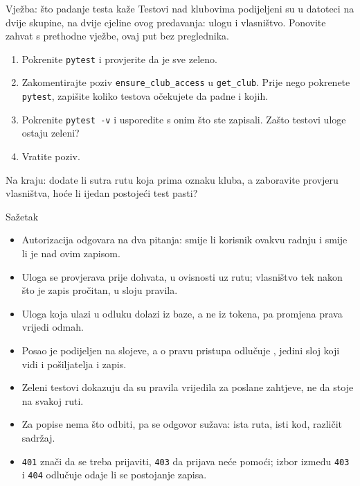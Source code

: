 \begin{frame}{Vježba: što padanje testa kaže}
Testovi nad klubovima podijeljeni su u datoteci na dvije skupine, na dvije cjeline ovog predavanja: ulogu i vlasništvo. Ponovite zahvat s prethodne vježbe, ovaj put bez preglednika.

\vspace{0.9em}
\begin{enumerate}
  \itemsep0.5em
  \item Pokrenite \texttt{pytest} i provjerite da je sve zeleno.
  \item Zakomentirajte poziv \texttt{ensure\_club\_access} u \texttt{get\_club}. Prije nego pokrenete \texttt{pytest}, zapišite koliko testova očekujete da padne i kojih.
  \item Pokrenite \texttt{pytest -v} i usporedite s onim što ste zapisali. Zašto testovi uloge ostaju zeleni?
  \item Vratite poziv.
\end{enumerate}

\vspace{0.9em}
Na kraju: dodate li sutra rutu koja prima oznaku kluba, a zaboravite provjeru vlasništva, hoće li ijedan postojeći test pasti?
\end{frame}

\begin{frame}{Sažetak}
\begin{itemize}
  \item Autorizacija odgovara na dva pitanja: smije li korisnik ovakvu radnju i smije li je nad ovim zapisom.
  \item Uloga se provjerava prije dohvata, u ovisnosti uz rutu; vlasništvo tek nakon što je zapis pročitan, u sloju pravila.
  \item Uloga koja ulazi u odluku dolazi iz baze, a ne iz tokena, pa promjena prava vrijedi odmah.
  \item Posao je podijeljen na slojeve, a o pravu pristupa odlučuje , jedini sloj koji vidi i pošiljatelja i zapis.
  \item Zeleni testovi dokazuju da su pravila vrijedila za poslane zahtjeve, ne da stoje na svakoj ruti.
  \item Za popise nema što odbiti, pa se odgovor sužava: ista ruta, isti kod, različit sadržaj.
  \item \texttt{401} znači da se treba prijaviti, \texttt{403} da prijava neće pomoći; izbor između \texttt{403} i \texttt{404} odlučuje odaje li se postojanje zapisa.
\end{itemize}
\end{frame}



